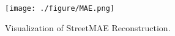 \begin{figure}
    \centering
    \texttt{[image: ./figure/MAE.png]}
    \caption{Visualization of StreetMAE Reconstruction.}
    \label{fig:MAE_visual}
\end{figure}